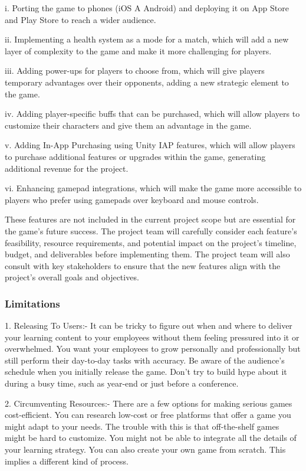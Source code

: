 \documentclass[12pt]{report}
\begin{document}
i. Porting the game to phones (iOS A Android) and deploying it on App Store and Play Store to reach a wider audience.

ii. Implementing a health system as a mode for a match, which will add a new layer of complexity to the game and make it more challenging for players.

iii. Adding power-ups for players to choose from, which will give players temporary advantages over their opponents, adding a new strategic element to the game.

iv. Adding player-specific buffs that can be purchased, which will allow players to customize their characters and give them an advantage in the game.

v. Adding In-App Purchasing using Unity IAP features, which will allow players to purchase additional features or upgrades within the game, generating additional revenue for the project.

vi. Enhancing gamepad integrations, which will make the game more accessible to players who prefer using gamepads over keyboard and mouse controls.

These features are not included in the current project scope but are essential for the game's future success. The project team will carefully consider each feature's feasibility, resource requirements, and potential impact on the project's timeline, budget, and deliverables before implementing them. The project team will also consult with key stakeholders to ensure that the new features align with the project's overall goals and objectives.

\subsubsection{Limitations}
\justifying
\setlength{\parindent}{2em}
\setlength{\parskip}{0.5em}
\renewcommand{\baselinestretch}{1.5}
\normalsize \hspace{1.7cm} 1. Releasing To Users:- It can be tricky to figure out when and where to deliver your learning content to your employees without them feeling pressured into it or overwhelmed. You want your employees to grow personally and professionally but still perform their day-to-day tasks with accuracy. Be aware of the audience’s schedule when you initially release the game. Don’t try to build hype about it during a busy time, such as year-end or just before a conference. 

2. Circumventing Resources:- There are a few options for making serious games cost-efficient. You can research low-cost or free platforms that offer a game you might adapt to your needs. The trouble with this is that off-the-shelf games might be hard to customize. You might not be able to integrate all the details of your learning strategy. You can also create your own game from scratch. This implies a different kind of process. 
\end{document}
